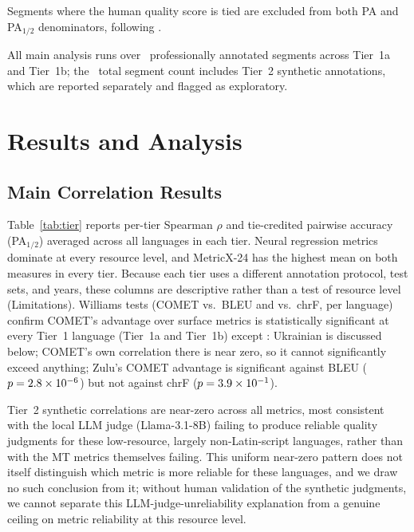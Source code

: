 \documentclass[11pt]{article}
\newcommand{\PAhalf}{PA$_{1/2}$}
\begin{document}
Segments where the human quality score is tied are excluded from both PA and \PAhalf{} denominators, following \citet{deutsch2023ties}.

All main analysis runs over \TierOneTotalSegments\ professionally annotated segments across Tier~1a and Tier~1b; the \TotalSegments\ total segment count includes Tier~2 synthetic annotations, which are reported separately and flagged as exploratory.

\section{Results and Analysis}
\label{sec:results}

\subsection{Main Correlation Results}

Table~\ref{tab:tier} reports per-tier Spearman $\rho$ and tie-credited pairwise accuracy (\PAhalf{}) averaged across all languages in each tier. Neural regression metrics dominate at every resource level, and MetricX-24 has the highest mean on both measures in every tier. Because each tier uses a different annotation protocol, test sets, and years, these columns are descriptive rather than a test of resource level (Limitations). Williams tests (COMET vs.\ BLEU and vs.\ chrF, per language) confirm COMET's advantage over surface metrics is statistically significant at every Tier~1 language (Tier~1a and Tier~1b) except \WilliamsTierOneExceptionLangs: Ukrainian is discussed below; COMET's own correlation there is near zero, so it cannot significantly exceed anything; Zulu's COMET advantage is significant against BLEU ($p=2.8\times10^{-6}$) but not against chrF ($p=3.9\times10^{-1}$).

Tier~2 synthetic correlations are near-zero across all metrics, most consistent with the local LLM judge (Llama-3.1-8B) failing to produce reliable quality judgments for these low-resource, largely non-Latin-script languages, rather than with the MT metrics themselves failing. This uniform near-zero pattern does not itself distinguish which metric is more reliable for these languages, and we draw no such conclusion from it; without human validation of the synthetic judgments, we cannot separate this LLM-judge-unreliability explanation from a genuine ceiling on metric reliability at this resource level.
\end{document}
